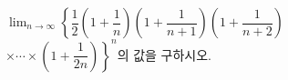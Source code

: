 $\displaystyle\lim_{n\to\infty}\left\{\dfrac{1}{2}\left(1+\dfrac{1}{n}\right)\left(1+\dfrac{1}{n+1}\right)\left(1+\dfrac{1}{n+2}\right)\right.$\\ \mbox{}\qquad $\left.\times\cdots\times\left(1+\dfrac{1}{2n}\right)\right\}^{n}$의 값을 구하시오.
